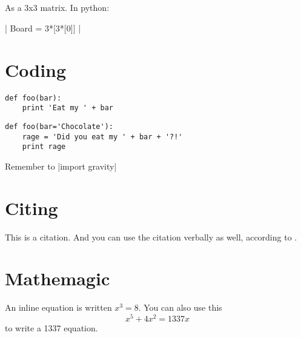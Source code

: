 \documentclass[00-main.tex]{subfiles}
\begin{document}
\subsection{}
As a 3x3 matrix. In python:

 | Board = 3*[3*[0]] |

\subsection{}

\subsection{}

\subsection{}

\subsection{}

\subsection{}


\section{Coding}

\begin{lstlisting}
def foo(bar):
    print 'Eat my ' + bar
\end{lstlisting}

\begin{listing}
\begin{verbatim} 
def foo(bar='Chocolate'):
    rage = 'Did you eat my ' + bar + '?!'
    print rage
\end{verbatim}
\end{listing}
Remember to  |import gravity|

\section{Citing}
This is a citation\cite{kiss-2010-I}. And you can use the citation verbally as well, according to \citet{kiss-2010-I}.

\section{Mathemagic}
An inline equation is written $x^3 = 8$. You can also use this
\begin{equation}
\label{eq:1337-equation}
x^5+4x^2=1337x
\end{equation}
to write a 1337 equation.
\bibliosub
\end{document}
